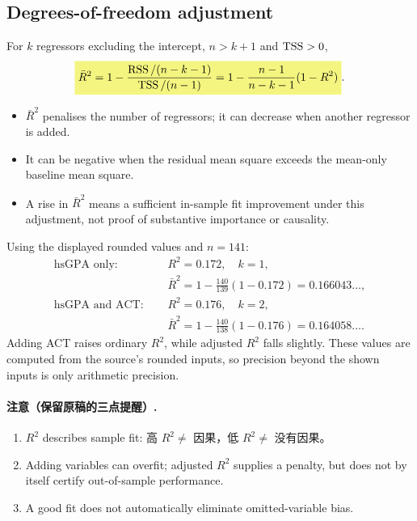 \subsection{Degrees-of-freedom adjustment}
For $k$ regressors excluding the intercept, $n>k+1$ and $\operatorname{TSS}>0$,
\begin{equation}\label{eq:adjusted-r2}
\hm{\bar R^2=1-\frac{\RSS/(n-k-1)}{\TSS/(n-1)}
=1-\frac{n-1}{n-k-1}(1-R^2)}.
\end{equation}
\begin{itemize}
\item $\bar R^2$ penalises the number of regressors; it can decrease when another regressor is added.
\item It can be negative when the residual mean square exceeds the mean-only baseline mean square.
\item A rise in $\bar R^2$ means a sufficient in-sample fit improvement under this adjustment, not proof of substantive importance or causality.
\end{itemize}

\begin{example}
Using the displayed rounded values and $n=141$:
\begin{align*}
\text{hsGPA only: }\quad &R^2=0.172,\quad k=1,\\
&\bar R^2=1-\frac{140}{139}(1-0.172)=0.166043\ldots,\\
\text{hsGPA and ACT: }\quad &R^2=0.176,\quad k=2,\\
&\bar R^2=1-\frac{140}{138}(1-0.176)=0.164058\ldots.
\end{align*}
Adding ACT raises ordinary $R^2$, while adjusted $R^2$ falls slightly. These values are computed from the source's rounded inputs, so precision beyond the shown inputs is only arithmetic precision.
\end{example}

\paragraph{注意（保留原稿的三点提醒）.}
\begin{enumerate}
\item $R^2$ describes sample fit: 高 $R^2\ne$ 因果，低 $R^2\ne$ 没有因果。
\item Adding variables can overfit; adjusted $R^2$ supplies a penalty, but does not by itself certify out-of-sample performance.
\item A good fit does not automatically eliminate omitted-variable bias.
\end{enumerate}


